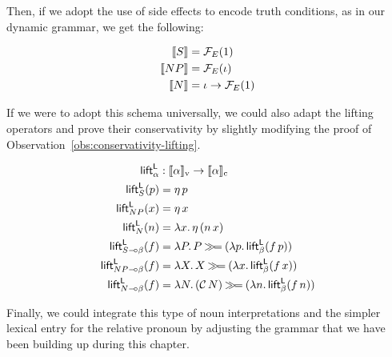 Then, if we adopt the use of side effects to encode truth conditions, as in
our dynamic grammar, we get the following:

\begin{align*}
  \llbracket S \rrbracket &= \mathcal{F}_E(1) \\
  \llbracket NP \rrbracket &= \mathcal{F}_E(\iota) \\
  \llbracket N \rrbracket &= \iota \to \mathcal{F}_E(1)
\end{align*}

If we were to adopt this schema universally, we could also adapt the
lifting operators and prove their conservativity by slightly modifying the
proof of Observation~\ref{obs:conservativity-lifting}.

\begin{align*}
  \textsf{lift}^{\textsf{L}}_\alpha &: \llbracket \alpha \rrbracket_{\mathrm{v}} \to \llbracket \alpha \rrbracket_{\mathrm{c}} \\
  \textsf{lift}^{\textsf{L}}_{S}(p) &= \eta\,p \\
  \textsf{lift}^{\textsf{L}}_{NP}(x) &= \eta\,x \\
  \textsf{lift}^{\textsf{L}}_{N}(n) &= \lambda x.\, \eta\,(n\,x) \\
  \textsf{lift}^{\textsf{L}}_{S \mathbin{{-}\mkern-3.5mu{\circ}} \beta}(f) &= \lambda P.\, P \mathbin{\gg\!=} (\lambda p.\, \textsf{lift}^{\textsf{L}}_\beta(f\,p)) \\
  \textsf{lift}^{\textsf{L}}_{NP \mathbin{{-}\mkern-3.5mu{\circ}} \beta}(f) &= \lambda X.\, X \mathbin{\gg\!=} (\lambda x.\, \textsf{lift}^{\textsf{L}}_\beta(f\,x)) \\
  \textsf{lift}^{\textsf{L}}_{N \mathbin{{-}\mkern-3.5mu{\circ}} \beta}(f) &= \lambda N.\, (\mathcal{C}\,N) \mathbin{\gg\!=} (\lambda n.\, \textsf{lift}^{\textsf{L}}_\beta(f\,n))
\end{align*}

Finally, we could integrate this type of noun interpretations and the
simpler lexical entry for the relative pronoun by adjusting the grammar that we
have been building up during this chapter.

